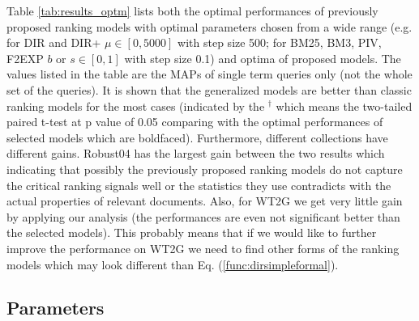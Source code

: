 Table \ref{tab:results_optm} lists both the optimal performances of 
previously proposed ranking models with optimal parameters chosen from 
a wide range (e.g. for DIR and DIR+ $\mu \in [0, 5000]$ with step size 
500; for BM25, BM3, PIV, F2EXP $b$ or $s \in [0, 1]$ with step size 0.1) 
and optima of proposed models. 
The values listed in the table are the MAPs of single 
term queries only (not the whole set of the queries).
It is shown that the generalized models are better than 
classic ranking models for the most cases (indicated 
by the $^\dagger$ which means the two-tailed paired t-test at p value 
of 0.05 comparing with the optimal performances of selected models 
which are boldfaced). 
Furthermore, different collections have different gains. 
Robust04 has the largest gain between the two results which indicating 
that possibly the previously proposed ranking models do not capture the 
critical ranking signals well or the statistics they use contradicts 
with the actual properties of relevant documents. 
Also, for WT2G we get very little gain by applying our analysis (the 
performances are even not significant better than the selected models). 
This probably means that if we would like to further improve the 
performance on WT2G we need to find other forms of the ranking models 
which may look different than Eq. (\ref{func:dirsimpleformal}). 



\subsection{Parameters}
\label{sec:res2}

